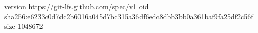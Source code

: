 version https://git-lfs.github.com/spec/v1
oid sha256:e6233c0d7dc2b6016a045d7bc315a36df6edc8dbb3bb0a361baf9fa25df2c56f
size 1048672
